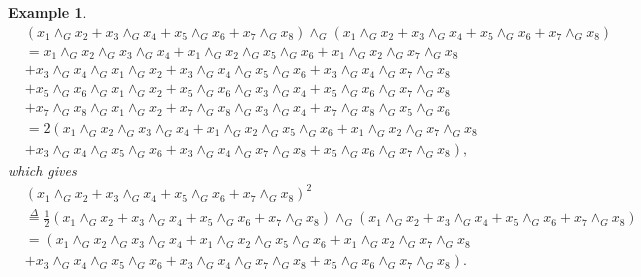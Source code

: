 \documentclass[aps,preprint]{revtex4}%
\newtheorem{example}[theorem]{Example}
\begin{document}
\begin{example}%
\begin{align*}
&  \left(  x_{1}\wedge_{G}x_{2}+x_{3}\wedge_{G}x_{4}+x_{5}\wedge_{G}%
x_{6}+x_{7}\wedge_{G}x_{8}\right)  \wedge_{G}\left(  x_{1}\wedge_{G}%
x_{2}+x_{3}\wedge_{G}x_{4}+x_{5}\wedge_{G}x_{6}+x_{7}\wedge_{G}x_{8}\right) \\
&  =x_{1}\wedge_{G}x_{2}\wedge_{G}x_{3}\wedge_{G}x_{4}+x_{1}\wedge_{G}%
x_{2}\wedge_{G}x_{5}\wedge_{G}x_{6}+x_{1}\wedge_{G}x_{2}\wedge_{G}x_{7}%
\wedge_{G}x_{8}\\
&  +x_{3}\wedge_{G}x_{4}\wedge_{G}x_{1}\wedge_{G}x_{2}+x_{3}\wedge_{G}%
x_{4}\wedge_{G}x_{5}\wedge_{G}x_{6}+x_{3}\wedge_{G}x_{4}\wedge_{G}x_{7}%
\wedge_{G}x_{8}\\
&  +x_{5}\wedge_{G}x_{6}\wedge_{G}x_{1}\wedge_{G}x_{2}+x_{5}\wedge_{G}%
x_{6}\wedge_{G}x_{3}\wedge_{G}x_{4}+x_{5}\wedge_{G}x_{6}\wedge_{G}x_{7}%
\wedge_{G}x_{8}\\
&  +x_{7}\wedge_{G}x_{8}\wedge_{G}x_{1}\wedge_{G}x_{2}+x_{7}\wedge_{G}%
x_{8}\wedge_{G}x_{3}\wedge_{G}x_{4}+x_{7}\wedge_{G}x_{8}\wedge_{G}x_{5}%
\wedge_{G}x_{6}\\
&  =2\left(  x_{1}\wedge_{G}x_{2}\wedge_{G}x_{3}\wedge_{G}x_{4}+x_{1}%
\wedge_{G}x_{2}\wedge_{G}x_{5}\wedge_{G}x_{6}+x_{1}\wedge_{G}x_{2}\wedge
_{G}x_{7}\wedge_{G}x_{8}\right. \\
&  +\left.  x_{3}\wedge_{G}x_{4}\wedge_{G}x_{5}\wedge_{G}x_{6}+x_{3}\wedge
_{G}x_{4}\wedge_{G}x_{7}\wedge_{G}x_{8}+x_{5}\wedge_{G}x_{6}\wedge_{G}%
x_{7}\wedge_{G}x_{8}\right)  ,
\end{align*}
which gives%
\begin{align}
&  \left(  x_{1}\wedge_{G}x_{2}+x_{3}\wedge_{G}x_{4}+x_{5}\wedge_{G}%
x_{6}+x_{7}\wedge_{G}x_{8}\right)  ^{2}\\
&  \overset{\Delta}{=}\frac{1}{2}\left(  x_{1}\wedge_{G}x_{2}+x_{3}\wedge
_{G}x_{4}+x_{5}\wedge_{G}x_{6}+x_{7}\wedge_{G}x_{8}\right)  \wedge_{G}\left(
x_{1}\wedge_{G}x_{2}+x_{3}\wedge_{G}x_{4}+x_{5}\wedge_{G}x_{6}+x_{7}\wedge
_{G}x_{8}\right) \\
&  =\left(  x_{1}\wedge_{G}x_{2}\wedge_{G}x_{3}\wedge_{G}x_{4}+x_{1}\wedge
_{G}x_{2}\wedge_{G}x_{5}\wedge_{G}x_{6}+x_{1}\wedge_{G}x_{2}\wedge_{G}%
x_{7}\wedge_{G}x_{8}\right. \\
&  +\left.  x_{3}\wedge_{G}x_{4}\wedge_{G}x_{5}\wedge_{G}x_{6}+x_{3}\wedge
_{G}x_{4}\wedge_{G}x_{7}\wedge_{G}x_{8}+x_{5}\wedge_{G}x_{6}\wedge_{G}%
x_{7}\wedge_{G}x_{8}\right)  .
\end{align}

\end{example}
\end{document}
